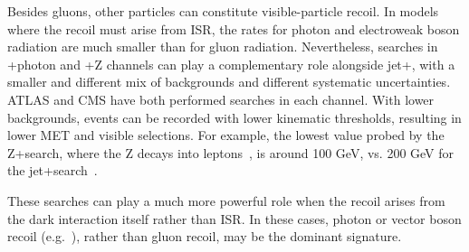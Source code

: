 

Besides gluons, other particles can constitute visible-particle recoil.
In models where the recoil must arise from ISR, the rates for photon and electroweak boson radiation are much smaller than for gluon radiation.
Nevertheless, searches in \MET+photon and \MET+Z channels can play a complementary role alongside jet+\MET, with a smaller and different mix of backgrounds and different systematic uncertainties.
ATLAS and CMS have both performed searches in each channel.
With lower backgrounds, events can be recorded with lower kinematic thresholds, resulting in lower MET and visible \pt{} selections.
For example, the lowest \MET value probed by the Z+\MET search, where the Z decays into leptons~\cite{Sirunyan:2017qfc,Aaboud:2017bja}, is around 100 GeV, vs. 
200 GeV for the jet+\MET search~\cite{Sirunyan:2017jix}.

These searches can play a much more powerful role when the recoil arises from the dark interaction itself rather than ISR.
In these cases, photon or vector boson recoil (e.g.~\cite{Birkedal:2004xn,Carpenter:2012rg}), rather than gluon recoil, may be the dominant signature.

